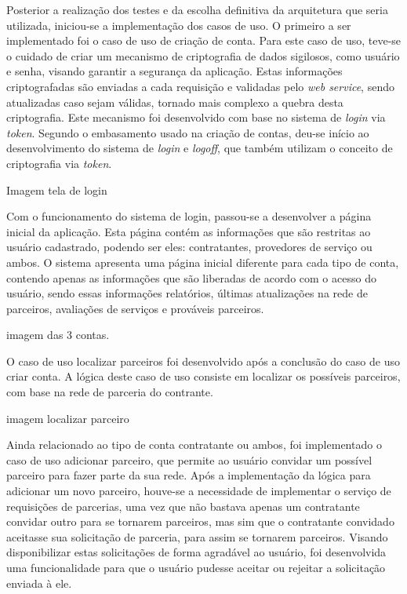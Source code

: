 \par Posterior a realização dos testes e da escolha definitiva da arquitetura que seria utilizada, iniciou-se a implementação dos casos de uso. O primeiro a ser implementado foi o caso de uso de criação de conta. Para este caso de uso, teve-se o cuidado de criar um mecanismo de criptografia de dados sigilosos, como usuário e senha, visando garantir a segurança da aplicação. Estas informações criptografadas são enviadas a cada requisição e validadas pelo \textit{web service}, sendo atualizadas caso sejam válidas, tornado mais complexo a quebra desta criptografia. Este mecanismo foi desenvolvido com base no sistema de \textit{login} via \textit{token}. Segundo o embasamento usado na criação de contas, deu-se início ao desenvolvimento do sistema de \textit{login} e \textit{logoff}, que também utilizam o conceito de criptografia via \textit{token}. 

Imagem tela de login

\par Com o funcionamento do sistema de login, passou-se a desenvolver a página inicial da aplicação. Esta página contém as informações que são restritas ao usuário cadastrado, podendo ser eles: contratantes, provedores de serviço ou ambos. O sistema apresenta uma página inicial diferente para cada tipo de conta, contendo apenas as informações que são liberadas de acordo com o acesso do usuário, sendo essas informações relatórios, últimas atualizações na rede de parceiros, avaliações de serviços e prováveis parceiros.

imagem das 3 contas.

\par O caso de uso localizar parceiros foi desenvolvido após a conclusão do caso de uso criar conta. A lógica deste caso de uso consiste em localizar os possíveis parceiros, com base na rede de parceria do contrante.

imagem localizar parceiro



\par Ainda relacionado ao tipo de conta contratante ou ambos, foi implementado o caso de uso adicionar parceiro, que permite ao usuário convidar um possível parceiro para fazer parte da sua rede. Após a implementação da lógica para adicionar um novo parceiro, houve-se a necessidade de implementar o serviço de requisições de parcerias, uma vez que não bastava apenas um contratante convidar outro para se tornarem parceiros, mas sim que o contratante convidado aceitasse sua solicitação de parceria, para assim se tornarem parceiros. Visando disponibilizar estas solicitações de forma agradável ao usuário, foi desenvolvida uma funcionalidade para que o usuário pudesse aceitar ou rejeitar a solicitação enviada à ele.

